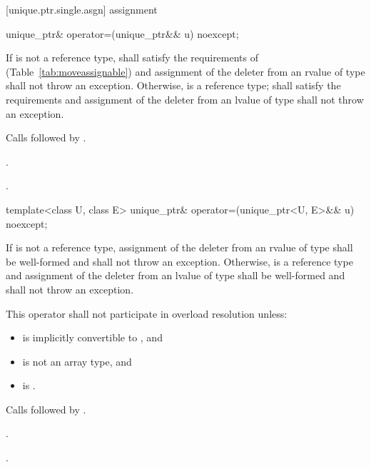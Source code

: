 [unique.ptr.single.asgn]{ assignment}

%
\begin{itemdecl}
unique_ptr& operator=(unique_ptr&& u) noexcept;
\end{itemdecl}

\begin{itemdescr}
\pnum
\requires If  is not a reference type,  shall satisfy the
requirements of  (Table~\ref{tab:moveassignable}) and assignment
of the deleter from an rvalue of type  shall not throw an exception.
Otherwise,  is a reference type;
 shall satisfy the 
requirements and assignment of the deleter from an
lvalue of type  shall not throw an exception.

\pnum
\effects Calls  followed by
.

\pnum
\returns {}.

\pnum
\postconditions {}.
\end{itemdescr}

%
\begin{itemdecl}
template<class U, class E> unique_ptr& operator=(unique_ptr<U, E>&& u) noexcept;
\end{itemdecl}

\begin{itemdescr}
\pnum
\requires If  is not a reference type, assignment of the deleter from
an rvalue of type  shall be well-formed and shall not throw an exception.
Otherwise,  is a reference type and assignment of the deleter from an lvalue
of type  shall be well-formed and shall not throw an exception.

\pnum
\remarks This operator shall not participate in overload resolution unless:

\begin{itemize}
\item {} is implicitly convertible to , and
\item {} is not an array type, and
\item {} is .
\end{itemize}

\pnum
\effects Calls  followed by
.

\pnum
\returns {}.

\pnum
\postconditions {}.
\end{itemdescr}

